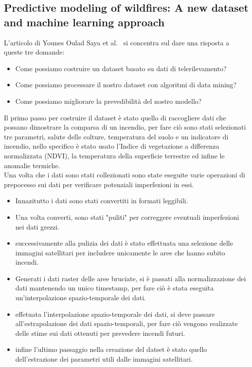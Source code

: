 \subsection{Predictive modeling of wildfires: A new dataset and machine learning approach}
L'articolo di Younes Oulad Saya et al.~\cite{ouladsaya2023wildfires} si concentra sul dare una risposta a queste tre domande:
\begin{itemize}
	\item Come possiamo costruire un dataset basato su dati di telerilevamento?
	\item Come possiamo processare il nostro dataset con algoritmi di data mining?
	\item Come possiamo migliorare la prevedibilità del nostro modello?
\end{itemize}
Il primo passo per costruire il dataset è stato quello di raccogliere dati che possano dimostrare la comparsa di un incendio, per fare ciò sono stati selezionati tre parametri, salute delle colture, temperatura del suolo e un indicatore di incendio, nello specifico è stato usato l'Indice di vegetazione a differenza normalizzata (NDVI), la temperatura della superficie terrestre ed infine le anomalie termiche.\\
Una volta che i dati sono stati collezionati sono state eseguite varie operazioni di prepocesso sui dati per verificare potenziali imperfezioni in essi.
\begin{itemize}
	\item Innazitutto i dati sono stati convertiti in formati leggibili.
	\item Una volta converti, sono stati "puliti" per correggere eventuali imperfezioni nei dati grezzi. 
	\item successivamente alla pulizia dei dati è stato effettuata una selezione delle immagini satellitari per includere unicamente le aree che hanno subito incendi.
	\item Generati i dati raster delle aree bruciate, si è passati alla normalizzazione dei dati mantenendo un unico timestamp, per fare ciò è stata eseguita un'interpolazione spazio-temporale dei dati.
	\item effetuata l'interpolazione spazio-temporale dei dati, si deve passare all'estrapolazione dei dati spazio-temporali, per fare ciò vengono realizzate delle stime sui dati ottenuti per prevedere incendi futuri.
	\item infine l'ultimo passaggio nella creazione del datset è stato quello dell'estrazione dei parametri utili dalle immagini satellitari.
\end{itemize}
